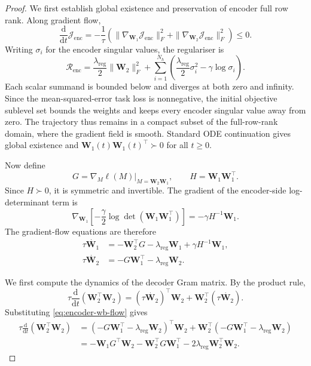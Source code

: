 \documentclass{article} %
\newcommand{\wa}{\mathbf{W}_1}
\newcommand{\wb}{\mathbf{W}_2}
\theoremstyle{remark}
\begin{document}
\begin{proof}
We first establish global existence and preservation of encoder
full row rank. Along gradient flow,
\[
\frac{\mathrm{d}}{\mathrm{d}t}\mathcal{J}_{\mathrm{enc}}
=
-\frac{1}{\tau}
\left(
\|\nabla_{\wa}\mathcal{J}_{\mathrm{enc}}\|_F^2
+
\|\nabla_{\wb}\mathcal{J}_{\mathrm{enc}}\|_F^2
\right)
\leq0.
\]
Writing $\sigma_i$ for the encoder singular values, the regulariser is
\[
\mathcal{R}_{\mathrm{enc}}
=
\frac{\lambda_{\mathrm{reg}}}{2}\|\wb\|_F^2
+
\sum_{i=1}^{N_h}
\left(
\frac{\lambda_{\mathrm{reg}}}{2}\sigma_i^2
-\gamma\log\sigma_i
\right).
\]
Each scalar summand is bounded below and diverges at both zero
and infinity. Since the mean-squared-error task loss is nonnegative,
the initial objective sublevel set bounds the weights and keeps
every encoder singular value away from zero. The trajectory thus
remains in a compact subset of the full-row-rank domain, where the
gradient field is smooth. Standard ODE continuation gives global
existence and $\wa(t)\wa(t)^\top\succ0$ for all $t\geq0$.

Now define
\[
G=\nabla_M\ell(M)\big|_{M=\wb\wa},
\qquad
H=\wa\wa^\top.
\]
Since $H\succ0$, it is symmetric and invertible. The gradient of the
encoder-side log-determinant term is
\begin{equation}
\nabla_{\wa}
\left[
-\frac{\gamma}{2}
\log\det\left(\wa\wa^\top\right)
\right]
=
-\gamma H^{-1}\wa.
\label{eq:encoder-logdet-gradient}
\end{equation}
The gradient-flow equations are therefore
\begin{align}
\tau\dot{\wa}
&=
-\wb^\top G
-\lambda_{\mathrm{reg}}\wa
+\gamma H^{-1}\wa,
\label{eq:encoder-wa-flow}
\\
\tau\dot{\wb}
&=
-G\wa^\top
-\lambda_{\mathrm{reg}}\wb.
\label{eq:encoder-wb-flow}
\end{align}

We first compute the dynamics of the decoder Gram matrix.
By the product rule,
\[
\tau\frac{\mathrm{d}}{\mathrm{d}t}
\left(\wb^\top\wb\right)
=
\left(\tau\dot{\wb}\right)^\top\wb
+
\wb^\top\left(\tau\dot{\wb}\right).
\]
Substituting \eqref{eq:encoder-wb-flow} gives
\begin{align}
\tau\frac{\mathrm{d}}{\mathrm{d}t}
\left(\wb^\top\wb\right)
&=
\left(
-G\wa^\top-\lambda_{\mathrm{reg}}\wb
\right)^\top\wb
+
\wb^\top
\left(
-G\wa^\top-\lambda_{\mathrm{reg}}\wb
\right)
\nonumber\\
&=
-\wa G^\top\wb
-\wb^\top G\wa^\top
-2\lambda_{\mathrm{reg}}\wb^\top\wb.
\label{eq:decoder-gram-dynamics}
\end{align}


\end{proof}
\end{document}
